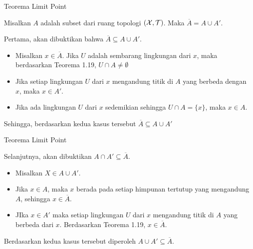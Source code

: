 \begin{frame}{Teorema Limit Point}
\begin{tcolorbox}[enhanced,title=Teorema 1.20, frame style tile={width=\paperwidth}{\wallpaper}]
Misalkan $A$ adalah subset dari ruang topologi $(\mathcal{X},\mathcal{T})$. Maka $\overline{A} = A \cup A'$.
\end{tcolorbox}

\begin{tcolorbox}[enhanced,title=Teorema 1.20 (Bukti), frame style tile={width=\paperwidth}{\wallpaper}]
Pertama, akan dibuktikan bahwa $\overline{A}\subseteq A\cup A'$.
\begin{itemize}
    \item Misalkan $x \in \overline{A}$. Jika $U$ adalah sembarang lingkungan dari $x$, maka berdasarkan Teorema 1.19, $U\cap A \neq \emptyset$
    \item Jika setiap lingkungan $U$ dari $x$ mengandung titik di $A$ yang berbeda dengan $x$, maka $x \in A'$.
    \item Jika ada lingkungan $U$ dari $x$ sedemikian sehingga $U\cap A = \{x\}$, maka $x\in A$.
\end{itemize}
Sehingga, berdasarkan kedua kasus tersebut $\overline{A}\subseteq A\cup A'$
\end{tcolorbox}
\end{frame}

\begin{frame}{Teorema Limit Point}
\begin{tcolorbox}[enhanced,title=Teorema 1.20 (Bukti), frame style tile={width=\paperwidth}{\wallpaper}]
Selanjutnya, akan dibuktikan $A\cap A'\subseteq \overline{A}$.
\begin{itemize}
    \item Misalkan $X\in A\cup A'$.
    \item Jika $x\in A$, maka $x$ berada pada setiap himpunan tertutup yang mengandung $A$, sehingga $x\in \overline{A}$.
    \item JIka $x\in A'$ maka setiap lingkungan $U$ dari $x$ mengandung titik di $A$ yang berbeda dari $x$. Berdasarkan Teorema 1.19, $x \in \overline{A}$.
\end{itemize}
Berdasarkan kedua kasus tersebut diperoleh $A\cup A'\subseteq \overline{A}$.
\end{tcolorbox}
    
\end{frame}

